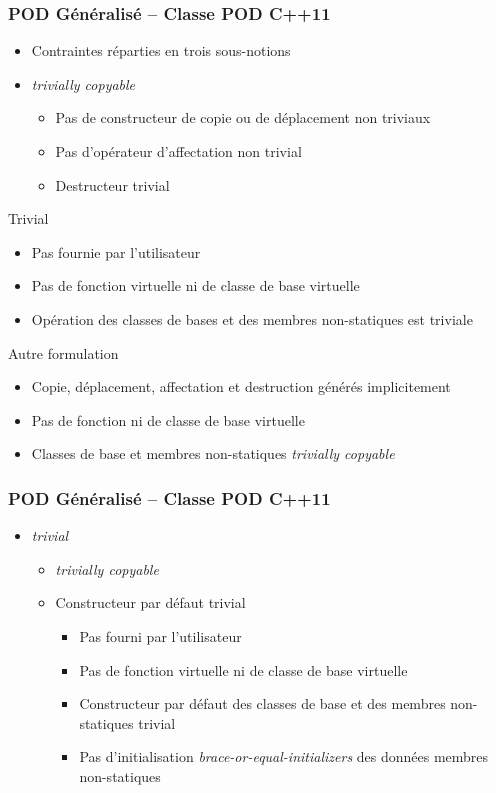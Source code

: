 \documentclass[C++.tex]{subfiles}
\begin{document}
\begin{frame}[fragile]
	\frametitle{POD Généralisé -- Classe POD C++11}
	\begin{itemize}
		\item Contraintes réparties en trois sous-notions
		\item \textit{trivially copyable}
		\begin{itemize}
			\item Pas de constructeur de copie ou de déplacement non triviaux
			\item Pas d'opérateur d'affectation non trivial
			\item Destructeur trivial
		\end{itemize}
	\end{itemize}

	\begin{block}{Trivial}
		\begin{itemize}
			\item Pas fournie par l'utilisateur
			\item Pas de fonction virtuelle ni de classe de base virtuelle
			\item Opération des classes de bases et des membres non-statiques est triviale
		\end{itemize}
	\end{block}

	\begin{block}{Autre formulation}
		\begin{itemize}
			\item Copie, déplacement, affectation et destruction générés implicitement
			\item Pas de fonction ni de classe de base virtuelle
			\item Classes de base et membres non-statiques \textit{trivially copyable}
		\end{itemize}
	\end{block}
\end{frame}

\begin{frame}[fragile]
	\frametitle{POD Généralisé -- Classe POD C++11}
	\begin{itemize}
		\item \textit{trivial}
		\begin{itemize}
			\item \textit{trivially copyable}
			\item Constructeur par défaut trivial
			\begin{itemize}
				\item Pas fourni par l'utilisateur
				\item Pas de fonction virtuelle ni de classe de base virtuelle
				\item Constructeur par défaut des classes de base et des membres non-statiques trivial
				\item Pas d'initialisation \textit{brace-or-equal-initializers} des données membres non-statiques
			\end{itemize}
		\end{itemize}
	\end{itemize}
\end{frame}
\end{document}
